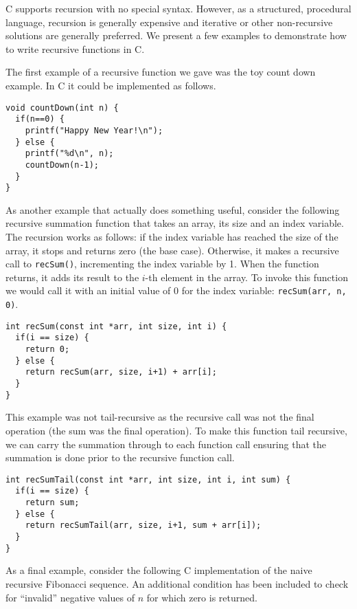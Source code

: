 

C supports recursion with no special syntax.  However, as a structured, 
procedural language, recursion is generally expensive and iterative or
other non-recursive solutions are generally preferred.  We present
a few examples to demonstrate how to write recursive functions in C.

The first example of a recursive function we gave was the toy count down
example.  In C it could be implemented as follows.

\begin{verbatim}
void countDown(int n) {
  if(n==0) {
    printf("Happy New Year!\n");
  } else {
    printf("%d\n", n);
    countDown(n-1);
  }
}
\end{verbatim}

As another example that actually does something useful, consider the
following recursive summation function that takes an array, its size
and an index variable.  The recursion works as follows: if the index
variable has reached the size of the array, it stops and returns zero
(the base case).  Otherwise, it makes a recursive call to 
\texttt{recSum()}, incrementing the index variable by 1.  When
the function returns, it adds its result to the $i$-th element
in the array.  To invoke this function we would call it with an initial
value of 0 for the index variable: \texttt{recSum(arr, n, 0)}.

\begin{verbatim}
int recSum(const int *arr, int size, int i) {
  if(i == size) {
    return 0;
  } else {
    return recSum(arr, size, i+1) + arr[i];
  }
}
\end{verbatim}

This example was not tail-recursive as the recursive call was not the
final operation (the sum was the final operation).  To make this function
tail recursive, we can carry the summation through to each function call
ensuring that the summation is done prior to the recursive function call.

\begin{verbatim}
int recSumTail(const int *arr, int size, int i, int sum) {
  if(i == size) {
    return sum;
  } else {
    return recSumTail(arr, size, i+1, sum + arr[i]);
  }
}
\end{verbatim}

As a final example, consider the following C implementation of the 
naive recursive Fibonacci sequence.  An additional condition has been
included to check for ``invalid'' negative values of $n$ for which
zero is returned.


